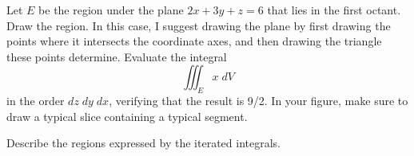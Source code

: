 \documentclass[12pt]{exam}
\theoremstyle{definition}
\begin{document}
\begin{questions}

\question Let $E$ be the region under the plane $2x+3y+z=6$ that lies in the first octant. Draw the region. In this case, I suggest drawing the plane by first drawing the points where it intersects the coordinate axes, and then drawing the triangle these points determine.
Evaluate the integral
\begin{equation*}
\iiint_{E} x \; dV
\end{equation*}
in the order $dz \; dy \; dx$, verifying that the result is 9/2. In your figure, make sure to draw a typical slice containing a typical segment.


\newpage

\question Describe the regions expressed by the iterated integrals.


\end{questions} 
\end{document}
